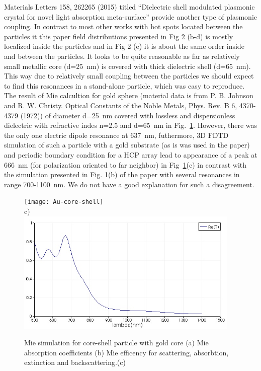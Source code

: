 \documentclass[a4paper]{article}
\begin{document}
Materials Letters 158, 262265 (2015) titled ``Dielectric shell
modulated plasmonic crystal for novel light absorption meta-surface''
provide another type of plasmonic coupling. In contrast to most other
works with hot spots located between the particles it this paper field
distributions presented in Fig 2 (b-d) is mostly localized inside the
particles and in Fig 2 (e) it is about the same order inside and
between the particles. It looks to be quite reasonable as far as
relatively small metallic core (d=25~nm) is covered with thick
dielectric shell (d=65~nm). This way due to relatively small coupling
between the particles we should expect to find this resonances in a
stand-alone particle, which was easy to reproduce. The result of Mie
calcultion for gold sphere (material data is from P. B. Johnson and
R. W. Christy. Optical Constants of the Noble Metals, Phys. Rev. B 6,
4370-4379 (1972)) of diameter d=25~nm covered with lossless and
dispersionless dielectric with refractive indes n=2.5 and d=65~nm in
Fig.~\ref{fig:Au-core-shell}. However, there was the only one electric
dipole resonance at 637~nm, futhermore, 3D FDTD simulation of such a
particle with a gold substrate (as is was used in the paper) and
periodic boundary condition for a HCP array lead to appearance of a
peak at 666~nm (for polarization oriented to far neighbor) in
Fig~\ref{fig:Au-core-shell}(c)  in contrast
with the simulation presented in Fig. 1(b) of the paper with several
resonances in range 700-1100~nm.  We do not
have a good explanation for such a disagreement.
\begin{figure}
  \texttt{[image: Au-core-shell]}\\
  c)\\
   \includegraphics[width=0.95\textwidth]{fdtd-Au-periodic-x-pol}
  \caption{Mie simulation for core-shell particle with gold core (a)
    Mie absorption coefficients (b) Mie efficency for scattering,
    absorbtion, extinction and backscattering.(c)\label{fig:Au-core-shell}}
\end{figure}
\end{document}
